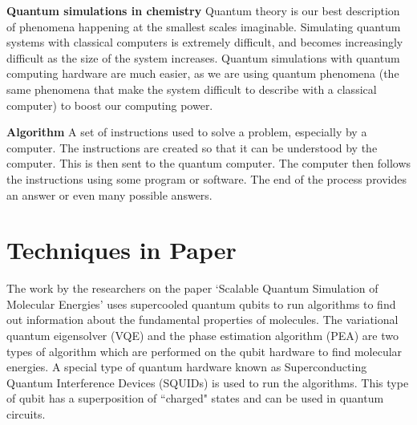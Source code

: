 \documentclass[14pt,landscape,color=UCLdarkred,margin=3cm]{uclposter}
\begin{document}
\begin{multicols}{3}
\begin{highlightbox}
\textbf{Quantum simulations in chemistry} Quantum theory is our best description of phenomena happening at the smallest scales imaginable. Simulating quantum systems with classical computers is extremely difficult, and becomes increasingly difficult as the size of the system increases. Quantum simulations with quantum computing hardware are much easier, as we are using quantum phenomena (the same phenomena that make the system difficult to describe with a classical computer) to boost our computing power.
\end{highlightbox}

\begin{highlightbox}
\textbf{Algorithm} A set of instructions used to solve a problem, especially by a computer. The instructions are created so that it can be understood by the computer. This is then sent to the quantum computer. The computer then follows the instructions using some program or software. The end of the process provides an answer or even many possible answers.
\end{highlightbox}

\columnbreak

\section*{Techniques in Paper}
The work by the researchers on the paper `Scalable Quantum Simulation of Molecular Energies' uses supercooled quantum qubits to run algorithms to find out information about the fundamental properties of molecules.
The variational quantum eigensolver (VQE) and the phase estimation algorithm (PEA) are two types of algorithm which are performed on the qubit hardware to find molecular energies. A special type of quantum hardware known as Superconducting Quantum Interference Devices (SQUIDs) is used to run the algorithms. This type of qubit has a superposition of ``charged" states and can be used in quantum circuits.


\end{multicols}
\end{document}
